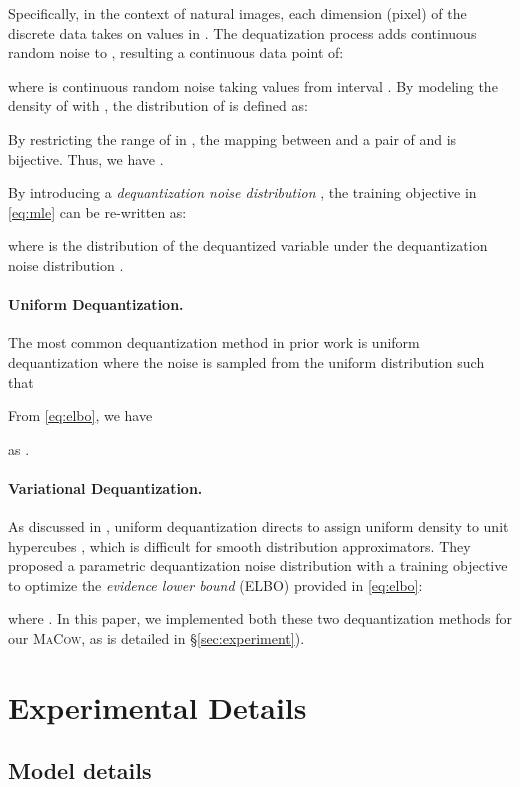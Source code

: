 \documentclass{article}
\begin{document}
Specifically, in the context of natural images, each dimension (pixel) of the discrete data  takes on values in .
The dequatization process adds continuous random noise  to , resulting a continuous data point of:

where  is continuous random noise taking values from interval .
By modeling the density of  with , the distribution of  is defined as:

By restricting the range of  in , the mapping between  and a pair of  and  is bijective. Thus, we have .

By introducing a \emph{dequantization noise distribution} , the training objective in \eqref{eq:mle} can be re-written as:

where  is the distribution of the dequantized variable  under the dequantization noise distribution .

\paragraph{Uniform Dequantization.} The most common dequantization method in prior work is uniform dequantization where the noise  is sampled from the uniform distribution  such that

From \eqref{eq:elbo}, we have 

as .

\paragraph{Variational Dequantization.} As discussed in \citet{ho2019flow++}, uniform dequantization directs  to assign uniform density to unit hypercubes , which is difficult for smooth distribution approximators.
They proposed a parametric dequantization noise distribution  with a training objective to optimize the \emph{evidence lower bound} (ELBO) provided in \eqref{eq:elbo}:

where .
In this paper, we implemented both these two dequantization methods for our \textsc{MaCow}, as is detailed in \S\ref{sec:experiment}).

\newpage
\section{Experimental Details}\label{appendix:model}
\subsection{Model details}
 
\end{document}
